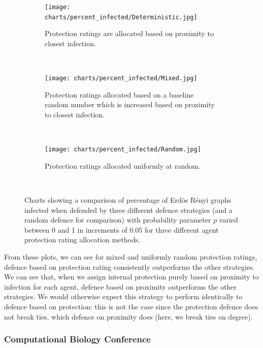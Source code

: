 \documentclass[../report.tex]{subfiles}
\begin{document}
\begin{figure}[!ht] 
  \begin{centering}
    \begin{subfigure}{0.6\linewidth}
      \centering
	  \texttt{[image: charts/percent\_infected/Deterministic.jpg]}
	  \caption{Protection ratings are allocated based on proximity to closest infection.}
      \label{fig:det-result}
    \end{subfigure}\\
    \begin{subfigure}{0.6\linewidth}
      \centering
      \texttt{[image: charts/percent\_infected/Mixed.jpg]}
	  \caption{Protection ratings allocated based on a baseline random number which is increased based on proximity to closest infection.}
      \label{fig:mix-result}
    \end{subfigure}\\
    \begin{subfigure}{0.6\linewidth}
      \centering
      \texttt{[image: charts/percent\_infected/Random.jpg]}
	  \caption{Protection ratings allocated uniformly at random.}
      \label{fig:ran-result}
    \end{subfigure}\\
  \end{centering}
  \caption{Charts showing a comparison of percentage of Erd\"{o}s R\'{e}nyi graphs infected when defended by three different defence strategies (and a random defence for comparison) with probability parameter $p$ varied between 0 and 1 in increments of 0.05  for three different agent protection rating allocation methods.}
  \label{fig:plots}
\end{figure}

From these plots, we can see for mixed and uniformly random protection ratings, defence based on protection rating consistently outperforms the other strategies. We can see that, when we assign internal protection purely based on proximity to infection for each agent, defence based on proximity outperforms the other strategies. We would otherwise expect this strategy to perform identically to defence based on protection: this is not the case since the protection defence does not break ties, which defence on proximity does (here, we break ties on degree).

\subsubsection{Computational Biology Conference}
\end{document}
